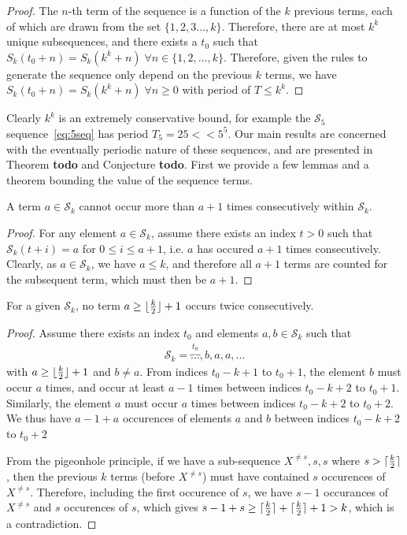 \documentclass[12pt,reqno]{article}
\DeclarePairedDelimiter\ceil{\lceil}{\rceil}
\DeclarePairedDelimiter\floor{\lfloor}{\rfloor}
\begin{document}
\begin{proof}
The $n$-th term of the sequence is a function of the $k$ previous terms, each of which are drawn from the set $\{1,2,3...,k\}$. Therefore, there are at most $k^k$ unique subsequences, and there exists a $t_0$ such that $S_k(t_0+n) = S_k(k^k+n) \; \forall n\in\{1,2,...,k\}$. Therefore, given the rules to generate the sequence only depend on the previous $k$ terms, we have $S_k(t_0+n) = S_k(k^k+n) \; \forall n \geq 0$ with period of $T \leq k^k$.
\end{proof}

Clearly $k^k$ is an extremely conservative bound, for example the $\mathcal{S}_5$ sequence~\eqref{eq:5seq} has period $T_5 = 25 << 5^5$. Our main results are concerned with the eventually periodic nature of these sequences, and are presented in Theorem \textbf{todo} and Conjecture \textbf{todo}. First we provide a few lemmas and a theorem bounding the value of the sequence terms.

\begin{lemma}\label{lem:longestRun}
A term $a\in\mathcal{S}_k$ cannot occur more than $a+1$ times consecutively within $\mathcal{S}_k$.  
\end{lemma}

\begin{proof}
For any element $a\in\mathcal{S}_k$, assume there exists an index $t>0$ such that $\mathcal{S}_k(t+i) = a$ for $0 \leq i \leq a+1$, i.e. $a$ has occured $a+1$ times consecutively. Clearly, as $a\in\mathcal{S}_k$, we have $a \leq k$, and therefore all $a+1$ terms are counted for the subsequent term, which must then be $a+1$.
\end{proof}

\begin{lemma}\label{lem:twiceInARow}
For a given $\mathcal{S}_k$, no term $a \geq \floor{\frac{k}{2}}+1$ occurs twice consecutively.
\end{lemma}

\begin{proof}
Assume there exists an index $t_0$ and elements $a,b\in\mathcal{S}_k$ such that 
\begin{align}
\mathcal{S}_k = \overbrace{...}^{t_0},b,a,a,...
\end{align}
with $a\geq \floor{\frac{k}{2}}+1$ and $b\neq a$. From indices $t_0 - k + 1$ to $t_0+1$, the element $b$ must occur $a$ times, and occur at least $a-1$ times between indices $t_0-k+2$ to $t_0+1$. Similarly, the element $a$ must occur $a$ times between indices $t_0 - k + 2$ to $t_0+2$. We thus have $a-1 + a$ occurences of elements $a$ and $b$ between indices $t_0 - k + 2$ to $t_0+2$



From the pigeonhole principle, if we have a sub-sequence $X^{\neq s},s,s$ where $s>\ceil{\frac{k}{2}}$, then the previous $k$ terms (before $X^{\neq s}$) must have contained $s$ occurences of $X^{\neq s}$. Therefore, including the first occurence of $s$, we have $s-1$ occurances of $X^{\neq s}$ and $s$ occurences of $s$, which gives $s-1+s \geq \ceil{\frac{k}{2}}+\ceil{\frac{k}{2}}+1 > k$, which is a contradiction.
\end{proof}
\end{document}
